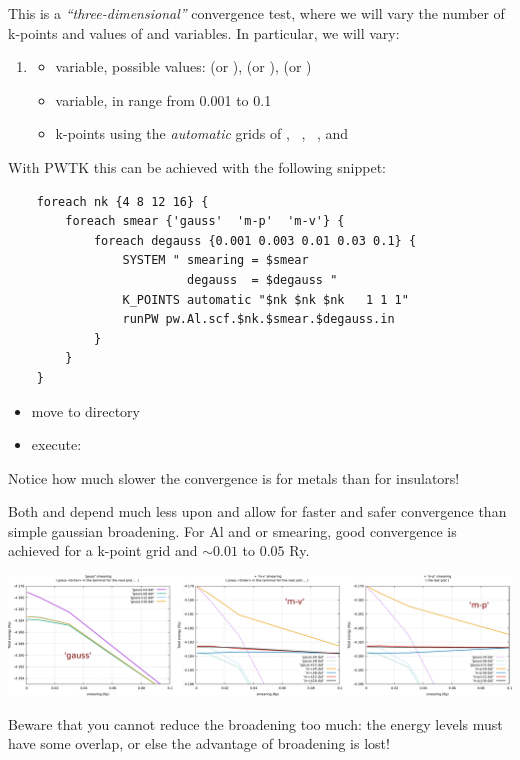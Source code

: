 \documentclass[landscape]{foils}
\begin{document}
%
This is a {\it ``three-dimensional''} convergence test, where we will
vary the number of k-points and values of  and
 variables. In particular, we will vary:
\begin{enumerate}
\item[]
  \begin{itemize}
  \item {} variable, possible values:
     (or ),  (or
    ),  (or )
  \item {} variable, in range from 0.001 to 0.1
  \item k-points using the {\em automatic} grids of ,
    ~, ~, and     
  \end{itemize}
\end{enumerate}
With PWTK this can be achieved with the following snippet:
{\codecolor\small
\begin{verbatim}
    foreach nk {4 8 12 16} {
        foreach smear {'gauss'  'm-p'  'm-v'} {
            foreach degauss {0.001 0.003 0.01 0.03 0.1} {
                SYSTEM " smearing = $smear  
                         degauss  = $degauss "
                K_POINTS automatic "$nk $nk $nk   1 1 1"
                runPW pw.Al.scf.$nk.$smear.$degauss.in
            }
        }
    }
\end{verbatim}
}

%
\begin{itemize}
\item move to  directory
\item execute: ~ 
\end{itemize}
\vspace{-1em}
Notice how much slower the convergence is for metals than for insulators!

Both  and  depend much less upon  and
allow for faster and safer convergence than simple gaussian
broadening. For Al and  or  smearing, good
convergence is achieved for a  k-point grid and
 $\sim 0.01$ to $0.05$ Ry.\\[1em]
\centerline{\includegraphics[width=1.0\textwidth]{figs/smearing.pdf}}
{\small\gray Beware that you cannot reduce the broadening too much: the energy levels
must have some overlap, or else the advantage of broadening is lost!}
\end{document}
